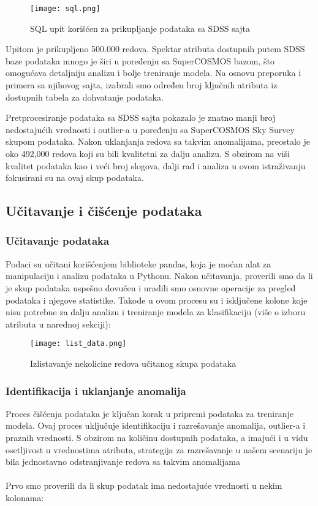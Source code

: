 \documentclass[a4paper,12pt]{article}
\begin{document}
\begin{figure}[H]
\centering
\texttt{[image: sql.png]}
\caption{SQL upit korišćen za prikupljanje podataka sa SDSS sajta}
\label{fig:sql_query}
\end{figure}

Upitom je prikupljeno 500.000 redova. Spektar atributa dostupnih putem SDSS baze podataka mnogo je širi u poređenju sa SuperCOSMOS bazom, što omogućava detaljniju analizu i bolje treniranje modela. Na osnovu preporuka i primera sa njihovog sajta, izabrali smo određen broj ključnih atributa iz dostupnih tabela za dohvatanje podataka.

Pretprocesiranje podataka sa SDSS sajta pokazalo je znatno manji broj nedostajućih vrednosti i outlier-a u poređenju sa SuperCOSMOS Sky Survey skupom podataka. Nakon uklanjanja redova sa takvim anomalijama, preostalo je oko 492,000 redova koji su bili kvalitetni za dalju analizu. S obzirom na viši kvalitet podataka kao i veći broj slogova, dalji rad i analiza u ovom istraživanju fokusirani su na ovaj skup podataka.

\subsection{Učitavanje i čišćenje podataka}


\subsubsection{Učitavanje podataka}
Podaci su učitani korišćenjem biblioteke pandas, koja je moćan alat za manipulaciju i analizu podataka u Pythonu. Nakon učitavanja, proverili smo da li je skup podataka uspešno dovučen i uradili smo osnovne operacije za pregled podataka i njegove statistike. Takođe u ovom procesu su i isključene kolone koje nisu potrebne za dalju analizu i treniranje modela za klasifikaciju (više o izboru atributa u narednoj sekciji):

\begin{figure}[H]
\centering
\texttt{[image: list\_data.png]}
\caption{Izlistavanje nekolicine redova učitanog skupa podataka}
\label{fig:sql_query}
\end{figure}

\subsubsection{Identifikacija i uklanjanje anomalija}
Proces čišćenja podataka je ključan korak u pripremi podataka za treniranje modela. Ovaj proces uključuje identifikaciju i razrešavanje anomalija, outlier-a i praznih vrednosti. S obzirom na količinu dostupnih podataka, a imajući i u vidu osetljivost u vrednostima atributa, strategija za razrešavanje u našem scenariju je bila jednostavno odstranjivanje redova sa takvim anomalijama\\\\
Prvo smo proverili da li skup podatak ima nedostajuće vrednosti u nekim kolonama:
\end{document}
